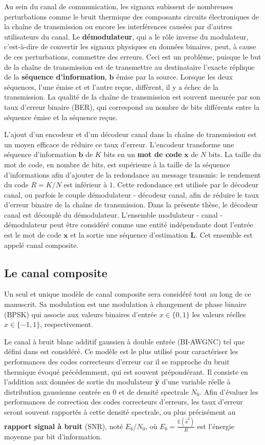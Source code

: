 Au sein du canal de communication, les signaux subissent de nombreuses perturbations comme le bruit thermique des composants circuits électroniques de la chaîne de transmission ou encore les interférences causées par d'autres utilisateurs du canal. Le \textbf{démodulateur}, qui a le rôle inverse du modulateur, c'est-à-dire de convertir les signaux physiques en données binaires, peut, à cause de ces perturbations, commettre des erreurs. Ceci est un problème, puisque le but de la chaîne de transmission est de transmettre au destinataire l'exacte réplique de la \textbf{séquence d'information}, $\mathbold{b}$ émise par la source. Lorsque les deux séquences, l'une émise et et l'autre reçue, diffèrent, il y a échec de la transmission. La qualité de la chaîne de transmission est souvent mesurée par son taux d'erreur binaire (BER), qui correspond au nombre de bits différents entre la séquence émise et la séquence reçue.

L'ajout d'un encodeur et d'un décodeur canal dans la chaîne de transmission est un moyen efficace de réduire ce taux d'erreur. L'encodeur transforme une séquence d'information $\mathbold{b}$ de $K$ bits en un \textbf{mot de code} $\mathbold{x}$ de $N$ bits. La taille du mot de code, en nombre de bits, est supérieure à la taille de la séquence d'informations afin d'ajouter de la redondance au message transmis: le rendement du code $R=K/N$ est inférieur à $1$. Cette redondance est utilisée par le décodeur canal, ou parfois le couple démodulateur - décodeur canal, afin de réduire le taux d'erreur binaire de la chaîne de transmission. Dans la présente thèse, le décodeur canal est découplé du démodulateur. L'ensemble modulateur - canal - démodulateur peut être considéré comme une entité indépendante dont l'entrée est le mot de code $\mathbold{x}$ et la sortie une séquence d'estimation $\mathbold{L}$. Cet ensemble est appelé canal composite.

\subsection{Le canal composite}
\label{subsec:canal}

Un seul et unique modèle de canal composite sera considéré tout au long de ce manuscrit. Sa modulation est une modulation à changement de phase binaire (BPSK) qui associe aux valeurs binaires d'entrée $x\in\{0,1\}$ les valeurs réelles $\hat{x}\in\{-1,1\}$, respectivement.

Le canal à bruit blanc additif gaussien à double entrée (BI-AWGNC) tel que défini dans \cite[Section~1.5.1.3]{ryan2009channel} est considéré. Ce modèle est le plus utilisé pour caractériser les performances des codes correcteurs d'erreur car il se rapproche du bruit thermique évoqué précédemment, qui est souvent prépondérant. Il consiste en l'addition aux données de sortie du modulateur $\mathbold{\hat{y}}$ d'une variable réelle à distribution gaussienne centrée en $0$ et de densité spectrale $N_0$. Afin d'évaluer les performances de correction des codes correcteurs d'erreurs, les taux d'erreur seront souvent rapportés à cette densité spectrale, ou plus précisément au \textbf{rapport signal à bruit} (SNR), noté $E_b/N_0$, où $E_b=\frac{\mathbb{E}(\hat{x}^2)}{R}$ est l'énergie moyenne par bit d'information.

